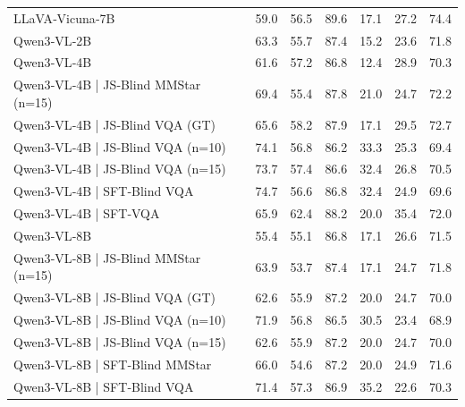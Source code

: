 \begin{tabular}{lrrrrrr}
LLaVA‑Vicuna‑7B & 59.0 & 56.5 & 89.6 & 17.1 & 27.2 & 74.4 \\
Qwen3‑VL‑2B & 63.3 & 55.7 & 87.4 & 15.2 & 23.6 & 71.8 \\
Qwen3‑VL‑4B & 61.6 & 57.2 & 86.8 & 12.4 & 28.9 & 70.3 \\
Qwen3‑VL‑4B | JS‑Blind MMStar (n=15) & 69.4 & 55.4 & 87.8 & 21.0 & 24.7 & 72.2 \\
Qwen3‑VL‑4B | JS‑Blind VQA (GT) & 65.6 & 58.2 & 87.9 & 17.1 & 29.5 & 72.7 \\
Qwen3‑VL‑4B | JS‑Blind VQA (n=10) & 74.1 & 56.8 & 86.2 & 33.3 & 25.3 & 69.4 \\
Qwen3‑VL‑4B | JS‑Blind VQA (n=15) & 73.7 & 57.4 & 86.6 & 32.4 & 26.8 & 70.5 \\
Qwen3‑VL‑4B | SFT‑Blind VQA & 74.7 & 56.6 & 86.8 & 32.4 & 24.9 & 69.6 \\
Qwen3‑VL‑4B | SFT‑VQA & 65.9 & 62.4 & 88.2 & 20.0 & 35.4 & 72.0 \\
Qwen3‑VL‑8B & 55.4 & 55.1 & 86.8 & 17.1 & 26.6 & 71.5 \\
Qwen3‑VL‑8B | JS‑Blind MMStar (n=15) & 63.9 & 53.7 & 87.4 & 17.1 & 24.7 & 71.8 \\
Qwen3‑VL‑8B | JS‑Blind VQA (GT) & 62.6 & 55.9 & 87.2 & 20.0 & 24.7 & 70.0 \\
Qwen3‑VL‑8B | JS‑Blind VQA (n=10) & 71.9 & 56.8 & 86.5 & 30.5 & 23.4 & 68.9 \\
Qwen3‑VL‑8B | JS‑Blind VQA (n=15) & 62.6 & 55.9 & 87.2 & 20.0 & 24.7 & 70.0 \\
Qwen3‑VL‑8B | SFT‑Blind MMStar & 66.0 & 54.6 & 87.2 & 20.0 & 24.9 & 71.6 \\
Qwen3‑VL‑8B | SFT‑Blind VQA & 71.4 & 57.3 & 86.9 & 35.2 & 22.6 & 70.3 \\
\bottomrule
\end{tabular}
